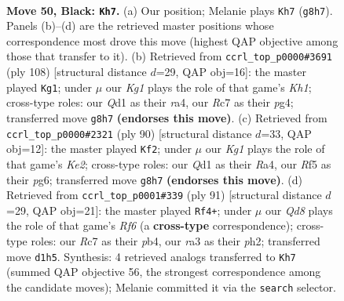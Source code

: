\documentclass[11pt]{article}
\begin{document}
\clearpage

\begin{figure}[p]\centering
\begin{subfigure}{0.46\textwidth}\centering
\resizebox{\linewidth}{!}{%
\newchessgame
\chessboard[
  setfen={6k1/2r3p1/1p4N1/5r2/P2pp3/R7/5PK1/3q4 b - - 5 50},
  showmover=false,
  pgfstyle=straightmove, color=movearrow, markmove={g8-h7}
]}
\caption{}
\end{subfigure}\hfill
\begin{subfigure}{0.46\textwidth}\centering
\resizebox{\linewidth}{!}{%
\newchessgame
\chessboard[
  setfen={8/2N5/P1p2kn1/7R/r3p1p1/2P3P1/7P/7K w - - 10 55},
  showmover=false,
  pgfstyle=straightmove, color=movearrow, markmove={h1-g1}
]}
\caption{}
\end{subfigure}
\\[4pt]
\begin{subfigure}{0.46\textwidth}\centering
\resizebox{\linewidth}{!}{%
\newchessgame
\chessboard[
  setfen={8/4kp2/6p1/p2r4/R5PP/5P2/4K3/8 w - - 1 46},
  showmover=false,
  pgfstyle=straightmove, color=movearrow, markmove={e2-f2}
]}
\caption{}
\end{subfigure}\hfill
\begin{subfigure}{0.46\textwidth}\centering
\resizebox{\linewidth}{!}{%
\newchessgame
\chessboard[
  setfen={8/5p1k/R6p/1p4p1/1P1K2P1/P4r2/7P/8 b - - 0 46},
  showmover=false,
  pgfstyle=straightmove, color=movearrow, markmove={f3-f4}
]}
\caption{}
\end{subfigure}
\caption{\textbf{Move 50, Black: \texttt{Kh7}.} (a) Our position; Melanie plays \texttt{Kh7} (\texttt{g8h7}). Panels (b)--(d) are the retrieved master positions whose correspondence most drove this move (highest QAP objective among those that transfer to it). (b) Retrieved from \texttt{ccrl\_top\_p0000\#3691} (ply 108) [structural distance $d$=29, QAP obj=16]: the master played \texttt{Kg1}; under $\mu$ our \emph{Kg1} plays the role of that game's \emph{Kh1}; cross-type roles: our \emph{Q}d1 as their \emph{r}a4, our \emph{R}c7 as their \emph{p}g4; transferred move \texttt{g8h7} \textbf{(endorses this move)}. (c) Retrieved from \texttt{ccrl\_top\_p0000\#2321} (ply 90) [structural distance $d$=33, QAP obj=12]: the master played \texttt{Kf2}; under $\mu$ our \emph{Kg1} plays the role of that game's \emph{Ke2}; cross-type roles: our \emph{Q}d1 as their \emph{R}a4, our \emph{R}f5 as their \emph{p}g6; transferred move \texttt{g8h7} \textbf{(endorses this move)}. (d) Retrieved from \texttt{ccrl\_top\_p0001\#339} (ply 91) [structural distance $d$=29, QAP obj=21]: the master played \texttt{Rf4+}; under $\mu$ our \emph{Qd8} plays the role of that game's \emph{Rf6} (a \textbf{cross-type} correspondence); cross-type roles: our \emph{R}c7 as their \emph{p}b4, our \emph{r}a3 as their \emph{p}h2; transferred move \texttt{d1h5}. Synthesis: 4 retrieved analogs transferred to \texttt{Kh7} (summed QAP objective 56, the strongest correspondence among the candidate moves); Melanie committed it via the \texttt{search} selector.}
\label{fig:thought-m99}
\end{figure}
\end{document}
